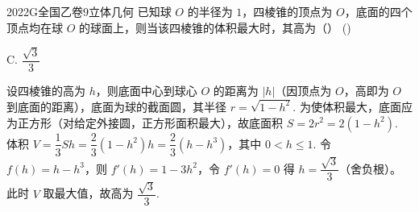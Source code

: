 
\begin{problem}{2022}{G}{全国乙卷}{9}{立体几何}
已知球 $ O $ 的半径为 $ 1 $，四棱锥的顶点为 $ O $，底面的四个顶点均在球 $ O $ 的球面上，则当该四棱锥的体积最大时，其高为（\hspace{1cm}） (\hspace{1cm})
\begin{choices}
\end{choices}
\end{problem}

\begin{answer}
C. $\dfrac{\sqrt{3}}{3}$
\end{answer}

\begin{solutions}
设四棱锥的高为 $ h $，则底面中心到球心 $ O $ 的距离为 $ |h| $（因顶点为 $ O $，高即为 $ O $ 到底面的距离），底面为球的截面圆，其半径 $ r = \sqrt{1 - h^2} $.  
为使体积最大，底面应为正方形（对给定外接圆，正方形面积最大），故底面积 $ S = 2r^2 = 2(1 - h^2) $.  
体积 $ V = \dfrac{1}{3}Sh = \dfrac{2}{3}(1 - h^2)h = \dfrac{2}{3}(h - h^3) $，其中 $ 0 < h \leq 1 $.  
令 $ f(h) = h - h^3 $，则 $ f'(h) = 1 - 3h^2 $，令 $ f'(h) = 0 $ 得 $ h = \dfrac{\sqrt{3}}{3} $（舍负根）。  
此时 $ V $ 取最大值，故高为 $ \dfrac{\sqrt{3}}{3} $.
\end{solutions}